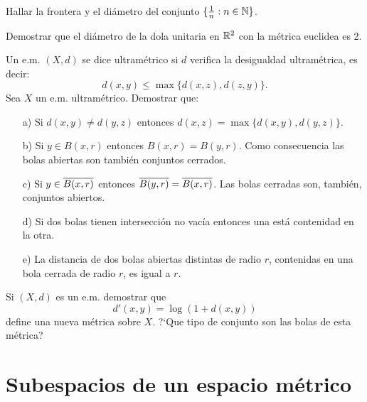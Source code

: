\begin{ejercicio}{} Hallar la frontera y el diámetro del conjunto
$\{\frac1n:n\in\mathbb{N}\}$.
\end{ejercicio}
\begin{ejercicio}{} Demostrar que el diámetro de la dola unitaria
en $\mathbb{R}^2$ con la métrica euclidea es 2.
\end{ejercicio}
\begin{ejercicio}{} Un e.m. $(X,d)$ se dice ultramétrico si $d$ verifica la
desigualdad ultramétrica, es decir:
\[
	d(x,y)\leq\max\{d(x,z),d(z,y)\}.
\]
Sea $X$ un e.m. ultramétrico. Demostrar que:
\begin{itemize}
\item[a)] Si $d(x,y)\neq d(y,z)$ entonces
$d(x,z)=\max\{d(x,y),d(y,z)\}$.
\item[b)] Si $y\in B(x,r)$ entonces $B(x,r)=B(y,r)$. Como
consecuencia las bolas abiertas son también conjuntos cerrados.
\item[c)] Si $y\in\overline{B(x,r)}$ entonces $\overline{B(y,r)}=\overline{B(x,r)}$.
Las bolas cerradas son, también, conjuntos abiertos.

\item[d)] Si dos bolas tienen intersección no vacía
entonces una está  contenidad en la otra.

\item[e)] La distancia de dos bolas abiertas distintas de radio
$r$, contenidas en una bola cerrada de radio $r$, es igual a $r$.
\end{itemize}
\end{ejercicio}

 \begin{ejercicio}{} Si $(X,d)$ es un e.m. demostrar que
 \[
	d'(x,y)=\log(1+d(x,y))
 \]
 define una nueva métrica sobre $X$. ?`Que tipo de conjunto son
 las bolas de esta métrica?
 \end{ejercicio}


% 
% 


\section{Subespacios de un espacio métrico}

